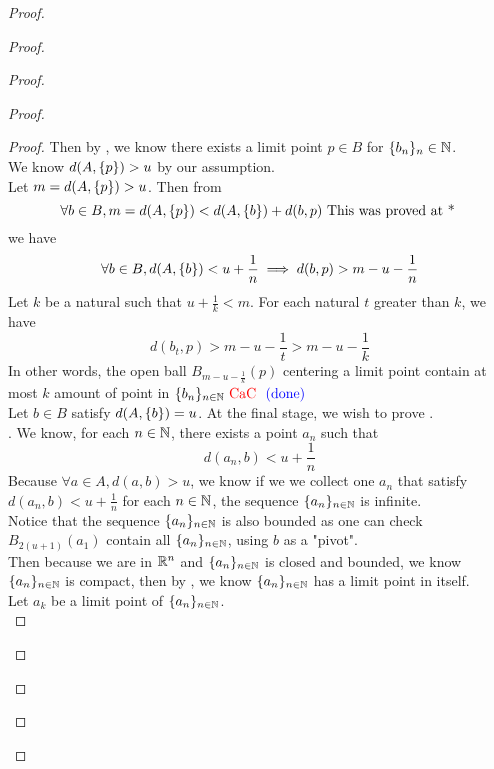 \documentclass{report}
\begin{document}
\begin{proof}
\begin{proof}
\begin{proof}
\begin{proof}
\begin{proof}
Then by , we know there exists a limit point $p\in B$ for $\{ b_n \}_n\in\mathbb{N}$.\\

We know $d(A,\{ p \})>u$ by our assumption.\\

Let $m=d(A,\{ p \})>u$. Then from
\begin{equation}
\forall b\in B,m=d(A,\{ p \})<d(A,\{ b \})+d(b,p)\text{ This was proved at * }
\end{equation}
we have
\begin{equation}
\forall b\in B, d(A,\{ b \})<u+\frac{1}{n}\implies d(b,p)>m-u-\frac{1}{n}
\end{equation}
Let $k$ be a natural such that  $u+\frac{1}{k}<m$. For each natural $t$ greater than  $k$, we have 
\begin{equation}
d(b_t,p)>m-u-\frac{1}{t}>m-u-\frac{1}{k}
\end{equation}
In other words, the open ball $B_{m-u-\frac{1}{k}}(p)$ centering a limit point contain at most $k$ amount of point in  $\{ b_n \}_{n\in\mathbb{N}}\text{ \textcolor{red}{CaC} }\textcolor{blue}{\text{ (done) }}$\\

Let $b\in B$ satisfy $d(A,\{ b \})=u$. At the final stage, we wish to prove .\\

. We know, for each $n\in\mathbb{N}$, there exists a point $a_n$ such that 
\begin{equation}
d(a_n,b)<u+\frac{1}{n}
\end{equation}
Because $\forall a\in A, d(a,b)>u$, we know if we we collect one $a_n$ that satisfy  $d(a_n,b)<u+\frac{1}{n}$ for each $n\in\mathbb{N}$, the sequence $\{ a_n \}_{n\in\mathbb{N}}$ is infinite.\\

Notice that the sequence $\{ a_n \}_{n\in\mathbb{N}}$ is also bounded as one can check $B_{2(u+1)}(a_1)$ contain all $\{ a_n \}_{n\in\mathbb{N}}$, using $b$ as a "pivot".\\

Then because we are in $\mathbb{R}^n$ and $\{ a_n \}_{n\in\mathbb{N}}$ is closed and bounded, we know $\{ a_n \}_{n\in\mathbb{N}}$ is compact, then by , we know $\{ a_n \}_{n\in\mathbb{N}}$ has a limit point in itself.\\

Let $a_k$ be a limit point of $\{ a_n \}_{n\in\mathbb{N}}$.\\


\end{proof}
\end{proof}
\end{proof}
\end{proof}
\end{proof}
\end{document}
